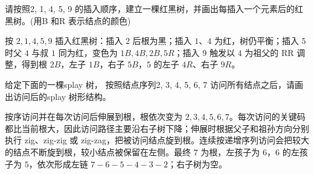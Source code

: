 \begin{question}[3 分]
请按照2, 1, 4, 5, 9 的插入顺序，建立一棵红黑树，并画出每插入一个元素后的红黑树。(用B 和R 表示结点的颜色)

\begin{solution}
按 $2,1,4,5,9$ 插入红黑树：插入 $2$ 后根为黑；插入 $1$、$4$ 为红，树仍平衡；插入 $5$ 时父 $4$ 与叔 $1$ 同为红，变色为 $1B,4B,2B,5R$；插入 $9$ 触发以 $4$ 为祖父的 RR 调整，得到根 $2B$，左子 $1B$，右子 $5B$，$5$ 的左子 $4R$、右子 $9R$。
\end{solution}
\end{question}

\begin{question}[2 分]
给定下面的一棵splay 树， 按照结点序列2, 3, 4, 5, 6, 7 访问所有结点之后，请画出访问后的splay 树形结构。

\begin{center}
\end{center}
\begin{solution}
按序访问并在每次访问后伸展到根，根依次变为 $2,3,4,5,6,7$。每次访问的关键码都比当前根大，因此访问路径主要沿右子树下降；伸展时根据父子和祖孙方向分别执行 zig、zig-zig 或 zig-zag，把被访问结点旋到根。连续按递增序列访问会把较大的结点不断旋到根，较小结点被保留在左侧。最终 $7$ 为根，左孩子为 $6$，$6$ 的左孩子为 $5$，依次形成左链 $7-6-5-4-3-2$；右子树为空。
\end{solution}
\end{question}

